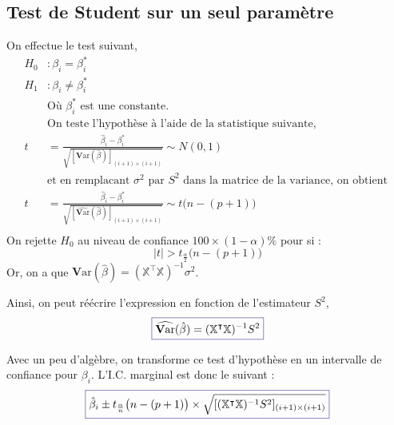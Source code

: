 \documentclass[11pt,french]{report}
\newcommand{\Var}{\mathrm{\textbf{V}ar}}
\begin{document}
\subsection{Test de Student sur un seul paramètre}
On effectue le test suivant, 
\begin{align*}
H_0 &: \beta_i = \beta_i^* \\
H_1 &: \beta_i \neq \beta_i^* \\
&\text{Où $\beta_i^*$ est une constante.} \\
&\text{On teste l'hypothèse à l'aide de la statistique suivante, } \\
t &= \frac{\hat{\beta}_i - \beta_i^* }{\sqrt{[{\Var}(\hat{\beta})]_{(i+1) \times (i+1)}}} \sim N(0, 1) \\
&\text{et en remplacant $\sigma^2$ par $S^2$ dans la matrice de la variance, on obtient }\\
t &= \frac{\hat{\beta}_i - \beta_i^* }{\sqrt{[\widehat{\Var}(\hat{\beta})]_{(i+1) \times (i+1)}}} \sim t\big(n-(p+1)\big) \\
\end{align*}
On rejette $H_0$ au niveau de confiance $100 \times (1 - \alpha)\%$ pour si :
$$
|t| > t_{\frac{\alpha}{2}}\big(n-(p+1)\big)
$$
Or, on a que $\Var(\hat{\mathbb{\beta}}) = (\mathbb{X}^\intercal\mathbb{X})^{-1}\sigma^2$. \newline

Ainsi, on peut réécrire l'expression en fonction de l'estimateur $S^2$, 
\begin{equation}
\label{eq:varmulti}
\color{Blue}
\boxed{\color{black}
\widehat{\Var}(\hat{\mathbb\beta}) = (\mathbb{X}^\intercal\mathbb{X})^{-1}S^2}
\end{equation}

Avec un peu d'algèbre, on transforme ce test d'hypothèse en un intervalle de confiance pour $\beta_i$. L'I.C. marginal est donc le suivant :
\begin{equation}
\label{eq:ICmulti}
\color{Blue}
\boxed{\color{black}
\hat{\beta}_i \pm t_{\frac{\alpha}{n}}\big(n - (p+1)\big) \times \sqrt{[(\mathbb{X}^\intercal\mathbb{X})^{-1}S^2]_{(i+1) \times (i+1)}}}
\end{equation}
\end{document}
